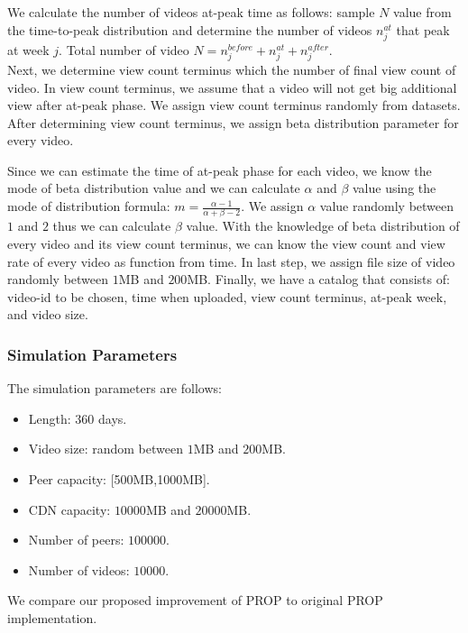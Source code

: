 \documentclass[10pt,final,journal,a4paper]{IEEEtran}
\begin{document}
We calculate the number of videos at-peak time as follows: sample $N$ value from the time-to-peak distribution and determine the number of videos $n_j^{at}$ that peak at week $j$. 
Total number of video $N = n_j^{before} + n_j^{at} + n_j^{after}$.\\
Next, we determine view count terminus which the number of final view count of video.
In view count terminus, we assume that a video will not get big additional view after at-peak phase.
We assign view count terminus randomly from datasets.
After determining view count terminus, we assign beta distribution parameter for every video. 

Since we can estimate the time of at-peak phase for each video, we know the mode of beta distribution value and we can calculate $\alpha$ and $\beta$ value using the mode of distribution formula: $m=\frac{\alpha-1}{\alpha + \beta - 2}$.  
We assign $\alpha$ value randomly between $1$ and $2$ thus we can calculate $\beta$ value.
With the knowledge of beta distribution of every video and its view count terminus, we can know the view count and view rate of every video as function from time.
In last step, we assign file size of video randomly between $1$MB and $200$MB.
Finally, we have a catalog that consists of: video-id to be chosen, time when uploaded, view count terminus, at-peak week, and video size.


\subsubsection{Simulation Parameters}
The simulation parameters are follows:
\begin{itemize}
\item Length: $360$ days.
\item Video size: random between $1$MB and $200$MB.
\item Peer capacity: [500MB,1000MB].
\item CDN capacity: $10000$MB and $20000$MB.
\item Number of peers: $100000$.
\item Number of videos: $10000$.
\end{itemize}
We compare our proposed improvement of PROP to original PROP \cite{1613869} implementation.
\end{document}

